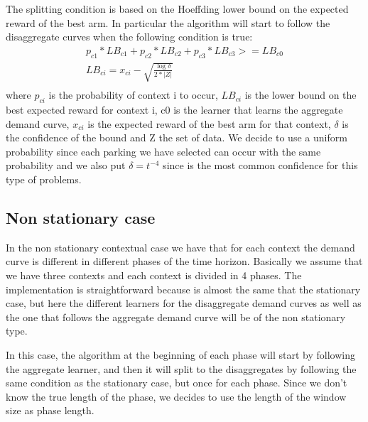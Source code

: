 The splitting condition is based on the Hoeffding lower bound on the expected reward of the best arm. In particular the algorithm will start to follow the disaggregate curves when the following condition is true:
\begin{gather*}
    p_{c1} * LB_{c1} + p_{c2} * LB_{c2} + p_{c3} * LB_{c3} >= LB_{c0}\\
    LB_{ci} = x_{ci} - \sqrt{\frac{\log{\delta}}{2 * |Z|}}\\
\end{gather*}
where $p_{ci}$ is the probability of context i to occur, $LB_{ci}$ is the lower bound on the best expected reward for context i, c0 is the learner that learns the aggregate demand curve, $x_{ci}$ is the expected reward of the best arm for that context, $\delta$ is the confidence of the bound and Z the set of data. We decide to use a uniform probability since each parking we have selected can occur with the same probability and we also put $\delta = t^{-4}$ since is the most common confidence for this type of problems.

\subsection{Non stationary case}\label{subsec:non-stationary-case2}
In the non stationary contextual case we have that for each context the demand curve is different in different phases of the time horizon. Basically we assume that we have three contexts and each context is divided in 4 phases. The implementation is straightforward because is almost the same that the stationary case, but here the different learners for the disaggregate demand curves as well as the one that follows the aggregate demand curve will be of the non stationary type.

In this case, the algorithm at the beginning of each phase will start by following the aggregate learner, and then it will split to the disaggregates by following the same condition as the stationary case, but once for each phase. Since we don't know the true length of the phase, we decides to use the length of the window size as phase length.

